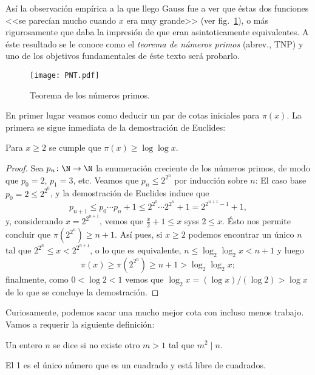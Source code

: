 \documentclass[teoria-numeros.tex]{subfiles}
\begin{document}
Así la observación empírica a la que llego Gauss fue a ver que éstas dos funciones <<se parecían mucho cuando $x$ era muy grande>> (ver fig.~\ref{fig:PNT}),
o más rigurosamente que daba la impresión de que eran asintoticamente equivalentes.
A éste resultado se le conoce como el \textit{teorema de números primos} (abrev., TNP) y uno de los objetivos fundamentales de éste texto será probarlo.
\begin{figure}[!hbt]
	\centering
	\texttt{[image: PNT.pdf]}
	\caption{Teorema de los números primos.}%
	\label{fig:PNT}
\end{figure}

En primer lugar veamos como deducir un par de cotas iniciales para $\pi(x)$.
La primera se sigue inmediata de la demostración de Euclides:
\begin{prop}
	Para $x \ge 2$ se cumple que $\pi(x) \ge \log\log x$.
\end{prop}
\begin{proof}
	Sea $p_n \colon \N \to \N$ la enumeración creciente de los números primos, de modo que $p_0 = 2$, $p_1 = 3$, etc.
	Veamos que $p_n \le 2^{2^n}$ por inducción sobre $n$:
	El caso base $p_0 = 2 \le 2^{2^0}$, y la demostración de Euclides induce que
	$$ p_{n+1} \le p_0\cdots p_n + 1 \le 2^{2^0}\cdots 2^{2^n} + 1 = 2^{2^{n+1} - 1} + 1, $$
	y, considerando $x = 2^{2^{n+1}}$, vemos que $\frac{x}{2} + 1 \le x$ syss $2 \le x$.
	Ésto nos permite concluir que $\pi(2^{2^n}) \ge n+1$.
	Así pues, si $x \ge 2$ podemos encontrar un único $n$ tal que $2^{2^n} \le x < 2^{2^{n+1}}$, o lo que es equivalente,
	$n \le \log_2\log_2 x < n+1$ y luego
	$$ \pi(x) \ge \pi(2^{2^n}) \ge n+1 > \log_2\log_2 x; $$
	finalmente, como $0 < \log 2 < 1$ vemos que $\log_2 x = (\log x)/(\log 2) > \log x$ de lo que se concluye la demostración.
\end{proof}

Curiosamente, podemos sacar una mucho mejor cota con incluso menos trabajo. Vamos a requerir la siguiente definición:
\begin{mydef}
	Un entero $n$ se dice  si no existe otro $m > 1$ tal que $m^2 \mid n$.
\end{mydef}
El 1 es el único número que es un cuadrado y está libre de cuadrados.
\end{document}
